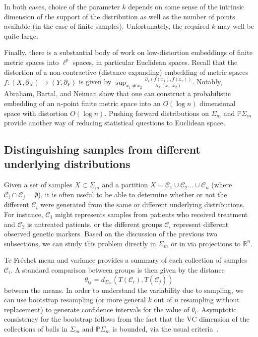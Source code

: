 \documentclass[a4paper,11pt]{article}
\newcommand{\aC}{\mathcal{C}}
\begin{document}
In both cases, choice of the parameter $k$ depends on some sense of the intrinsic dimension of the support of the distribution as well as the number of points available (in the case of finite samples).
Unfortunately, the required $k$ may well be quite large.

Finally, there is a substantial body of work on low-distortion embeddings of finite metric spaces into $\ell^p$ spaces, in particular Euclidean spaces.
Recall that the distortion of a non-contractive (distance expanding) embedding of metric spaces $f \colon (X, \partial_X) \to (Y, \partial_Y)$ is given by $\sup_{x_1 \neq x_2} \frac{\partial_Y (f(x_1), f(x_2))}{\partial_X (x_1, x_2)}$.
Notably, Abraham, Bartal, and Neiman show that one can construct a probabilistic embedding of an $n$-point finite metric space into an $O(\log n)$ dimensional space with distortion $O(\log n)$.
Pushing forward distributions on $\Sigma_m$ and $\mathbb{P}\Sigma_m$ provide another way of reducing statistical questions to Euclidean space.

\subsection{Distinguishing samples from different underlying distributions}

Given a set of samples $X \subset \Sigma_m$ and a partition $X = \aC_1 \cup \aC_2 \ldots \cup \aC_n$ (where $\aC_i \cap \aC_j = \emptyset$), it is often useful to be able to determine whether or not the different $\aC_i$ were generated from the same or different underlying distributions.
For instance, $\aC_1$ might represents samples from patients who received treatment and $\aC_2$ is untreated patients, or the different groups $\aC_i$ represent different observed genetic markers.
Based on the discussion of the previous two subsections, we can study this problem directly in $\Sigma_m$ or in via projections to $\mathbb{R}^n$.

Te Fr\'echet mean and variance provides a summary of each collection of samples $\aC_i$.
A standard comparison between groups is then given by the distance 
\[
\theta_{ij} = d_{\Sigma_m}(T(\aC_i), T(\aC_j))
\]
between the means.
In order to understand the variability due to sampling, we can use bootstrap resampling (or more general $k$ out of $n$ resampling without replacement) to generate confidence intervals for the value of $\theta_i$.
Asymptotic consistency for the bootstrap follows from the fact that the VC dimension of the collections of balls in $\Sigma_m$ and $\mathbb{P}\Sigma_m$ is bounded, via the usual criteria~\cite{Gine1984, Gine1986, Gine1990}.
\end{document}
